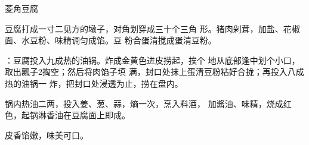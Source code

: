 \begin{recipe}{菱角豆腐}

\ingredients



\cooking

\step 豆腐打成一寸二见方的墩子，对角划穿成三十个三角 形。猪肉剁茸，加盐、花椒面、水豆粉、味精调匀成馅。豆 粉合蛋清搅成蛋清豆粉。

：豆腐投入九成热的油锅。炸成金黄色进皮捞起，挨个 地从底部逢中划个小口，取出瓤子2掏空；然后将肉馅子填 满，封口处抹上蛋清豆粉粘好合拢；再投入八成热的油锅一 炸，把封口处浸透为止，捞在盘内。

\step 锅内热油二两，投入姜、葱、蒜，熵一次，烹入料酒， 加酱油、味精，烧成红色，起锅淋香油在豆腐面上即成。

\notes

皮香馅嫩，味美可口。

\end{recipe}

